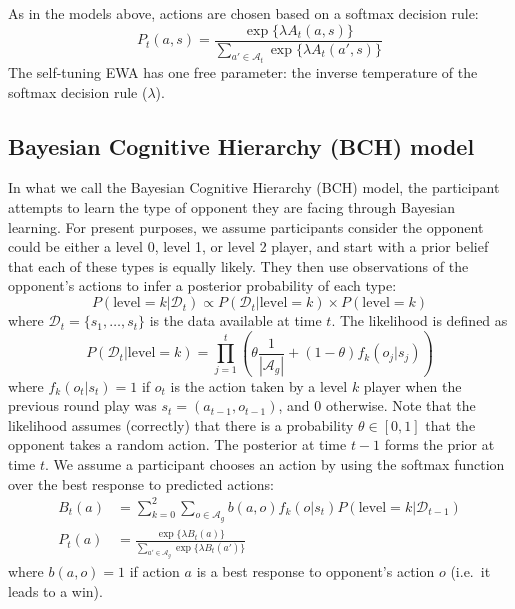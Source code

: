 \documentclass[
  english,
  man,floatsintext]{apa6}
\begin{document}
As in the models above, actions are chosen based on a softmax decision rule:
\[P_t(a,s) = \frac{\exp \{\lambda  A_{t}(a,s) \} }{\sum_{a' \in \mathcal{A}_t} \exp \{ \lambda A_{t}(a',s) \} }\]
The self-tuning EWA has one free parameter: the inverse temperature of the softmax decision rule (\(\lambda\)).

\subsection{Bayesian Cognitive Hierarchy (BCH) model}

In what we call the Bayesian Cognitive Hierarchy (BCH) model, the participant attempts to learn the type of opponent they are facing through Bayesian learning. For present purposes, we assume participants consider the opponent could be either a level 0, level 1, or level 2 player, and start with a prior belief that each of these types is equally likely. They then use observations of the opponent's actions to infer a posterior probability of each type:
\[P(\text{level}=k | \mathcal{D}_{t})  \propto  P(\mathcal{D}_{t}|\text{level}=k ) \times P(\text{level}=k)\]
where \(\mathcal{D}_{t} = \{s_1,\ldots,s_t\}\) is the data available at time \(t\). The likelihood is defined as
\[P(\mathcal{D}_{t}|\text{level}=k) = \prod_{j=1}^t \left( \theta \frac{1}{|\mathcal{A}_g|} + (1-\theta) f_k(o_j|s_{j})\right)\]
where \(f_k(o_t|s_{t}) = 1\) if \(o_t\) is the action taken by a level \(k\) player when the previous round play was \(s_t = (a_{t-1}, o_{t-1})\), and 0 otherwise. Note that the likelihood assumes (correctly) that there is a probability \(\theta \in [0,1]\) that the opponent takes a random action. The posterior at time \(t-1\) forms the prior at time \(t\). We assume a participant chooses an action by using the softmax function over the best response to predicted actions:
\[\begin{aligned} B_t(a) &= \sum_{k = 0}^2 \sum_{o \in \mathcal{A}_g} b(a,o) f_k(o|s_{t})  P(\text{level}=k|\mathcal{D}_{t-1})\\
P_t(a) &= \frac{\exp\{\lambda B_t(a) \}}{\sum_{a' \in \mathcal{A}_g} \exp \{ \lambda B_t(a')\}} \end{aligned}\]
where \(b(a,o) = 1\) if action \(a\) is a best response to opponent's action \(o\) (i.e.~it leads to a win).
\end{document}
